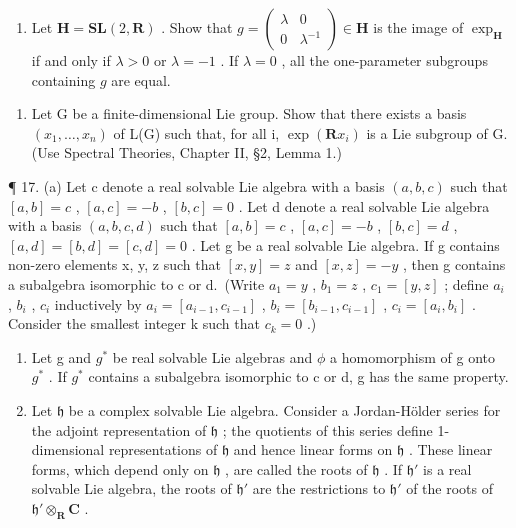 \begin{enumerate}
\def\labelenumi{(\alph{enumi})}
\setcounter{enumi}{1}
\tightlist
\item
  Let \(\mathbf{H} = \mathbf{SL}(2, \mathbf{R})\) . Show that \(g = \begin{pmatrix} \lambda & 0 \\ 0 & \lambda^{-1} \end{pmatrix} \in \mathbf{H}\) is the image of \(\exp_{\mathbf{H}}\) if and only if \(\lambda > 0\) or \(\lambda = -1\) . If \(\lambda = 0\) , all the one-parameter subgroups containing \(g\) are equal.
\end{enumerate}

\begin{enumerate}
\def\labelenumi{\arabic{enumi}.}
\setcounter{enumi}{15}
\tightlist
\item
  Let G be a finite-dimensional Lie group. Show that there exists a basis \((x_{1},\ldots,x_{n})\) of L(G) such that, for all i, \(\exp(\mathbf{R}x_{i})\) is a Lie subgroup of G. (Use Spectral Theories, Chapter II, §2, Lemma 1.)
\end{enumerate}

¶ 17. (a) Let c denote a real solvable Lie algebra with a basis \((a, b, c)\) such that \([a, b] = c\) , \([a, c] = -b\) , \([b, c] = 0\) . Let d denote a real solvable Lie algebra with a basis \((a, b, c, d)\) such that \([a, b] = c\) , \([a, c] = -b\) , \([b, c] = d\) , \([a, d] = [b, d] = [c, d] = 0\) . Let g be a real solvable Lie algebra. If g contains non-zero elements x, y, z such that \([x, y] = z\) and \([x, z] = -y\) , then g contains a subalgebra isomorphic to c or d.~(Write \(a_{1} = y\) , \(b_{1} = z\) , \(c_{1} = [y, z]\) ; define \(a_{i}\) , \(b_{i}\) , \(c_{i}\) inductively by \(a_{i} = [a_{i-1}, c_{i-1}]\) , \(b_{i} = [b_{i-1}, c_{i-1}]\) , \(c_{i} = [a_{i}, b_{i}]\) . Consider the smallest integer k such that \(c_{k} = 0\) .)

\begin{enumerate}
\def\labelenumi{(\alph{enumi})}
\setcounter{enumi}{1}
\item
  Let g and \(g^{*}\) be real solvable Lie algebras and \(\phi\) a homomorphism of g onto \(g^{*}\) . If \(g^{*}\) contains a subalgebra isomorphic to c or d, g has the same property.
\item
  Let \(\mathfrak{h}\) be a complex solvable Lie algebra. Consider a Jordan-Hölder series for the adjoint representation of \(\mathfrak{h}\) ; the quotients of this series define 1-dimensional representations of \(\mathfrak{h}\) and hence linear forms on \(\mathfrak{h}\) . These linear forms, which depend only on \(\mathfrak{h}\) , are called the roots of \(\mathfrak{h}\) . If \(\mathfrak{h}'\) is a real solvable Lie algebra, the roots of \(\mathfrak{h}'\) are the restrictions to \(\mathfrak{h}'\) of the roots of \(\mathfrak{h}' \otimes_{\mathbf{R}} \mathbf{C}\) .
\end{enumerate}

